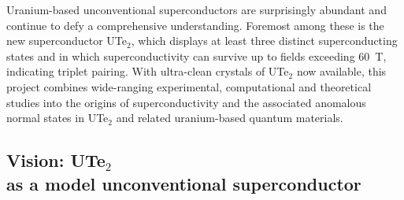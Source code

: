 \onecolumngrid

\begin{mdframed}[hidealllines=true,backgroundcolor=blue!5,innerleftmargin=5pt,innerrightmargin=5pt,innertopmargin=5pt,innerbottommargin=5pt]
\noindent
Uranium-based unconventional superconductors are surprisingly abundant and continue to defy a comprehensive understanding. Foremost among these is the new superconductor UTe$_2$,  which displays at least three distinct superconducting states and in which superconductivity can survive up to fields exceeding \SI{60}{\tesla}, indicating triplet pairing. With ultra-clean crystals of UTe$_2$ now available, this project combines wide-ranging experimental, computational and theoretical studies into the origins of superconductivity and the associated anomalous normal states in UTe$_2$ and related uranium-based quantum materials. %
\end{mdframed}
  
\twocolumngrid


\subsection*{Vision: UTe$_2$ \\ as a model unconventional superconductor}
\noindent
